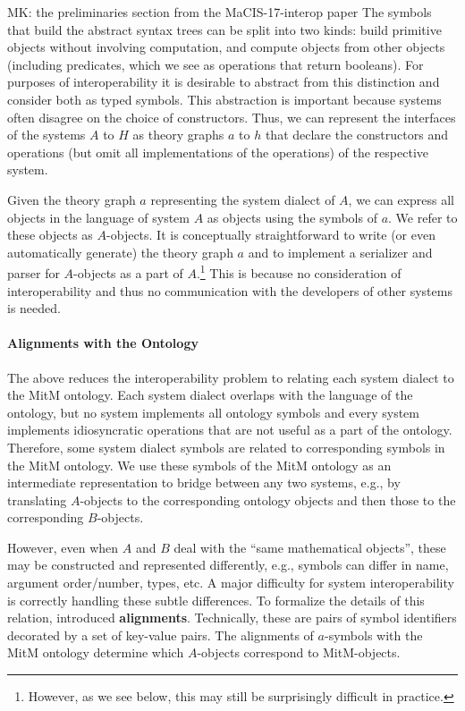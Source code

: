 \begin{newpart}{MK: the preliminaries section from the MaCIS-17-interop paper}
The symbols that build the abstract syntax trees can be split into two kinds:  build primitive objects without involving computation, and 
compute objects from other objects (including predicates, which we see as operations that return booleans).
For purposes of interoperability it is desirable to abstract from this distinction and consider both as typed symbols.
This abstraction is important because systems often disagree on the choice of constructors.
Thus, we can represent the interfaces of the systems $A$ to $H$ as \OMMT theory graphs $a$ to $h$ that declare the constructors and operations (but omit all implementations of the operations) of the respective system.

Given the theory graph $a$ representing the system dialect of $A$, we can express all objects in the language of system $A$ as \OMMT objects using the symbols of $a$.
We refer to these objects as $A$-objects.
It is conceptually straightforward to write (or even automatically generate) the theory graph $a$ and to implement a serializer and parser for $A$-objects as a part of $A$.\footnote{However, as we see below, this may still be surprisingly difficult in practice.}
This is because no consideration of interoperability and thus no communication with the developers of other systems is needed.


\paragraph{Alignments with the Ontology}
The above reduces the interoperability problem to relating each system dialect to the MitM ontology.
Each system dialect overlaps with the language of the ontology, but no system implements all ontology symbols and every system implements idiosyncratic operations that are not useful as a part of the ontology.
Therefore, some system dialect symbols are related to corresponding symbols in the MitM ontology.
We use these symbols of the MitM ontology as an intermediate representation to bridge between any two systems, e.g., by translating $A$-objects to the corresponding ontology objects and then those to the corresponding $B$-objects.

However, even when $A$ and $B$ deal with the ``same mathematical objects'', these may be constructed and represented differently, e.g., symbols can differ in name,
argument order/number, types, etc.
A major difficulty for system interoperability is correctly handling these subtle differences.
To formalize the details of this relation, \cite{MueGauKal:cacfms17} introduced \OMMT \textbf{alignments}.
Technically, these are pairs of \OMMT symbol identifiers decorated by a set of key-value pairs.
The alignments of $a$-symbols with the MitM ontology determine which $A$-objects correspond to MitM-objects.


\end{newpart}

